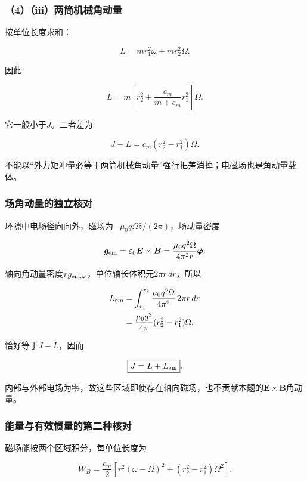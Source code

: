 \documentclass[12pt,a4paper,fontset=fandol]{ctexart}
\begin{document}
\subsubsection{（4）（iii）两筒机械角动量}\label{iiiux4e24ux7b52ux673aux68b0ux89d2ux52a8ux91cf}

按单位长度求和：

\[
L=m r_1^2\omega+m r_2^2\Omega.
\]

因此

\[
\boxed{
L=m\left[r_2^2+\frac{c_m}{m+c_m}r_1^2\right]\Omega}.
\]

它一般小于\(J\)。二者差为

\[
\boxed{J-L=c_m(r_2^2-r_1^2)\Omega}.
\]

不能以``外力矩冲量必等于两筒机械角动量''强行把差消掉；电磁场也是角动量载体。

\subsubsection{场角动量的独立核对}\label{ux573aux89d2ux52a8ux91cfux7684ux72ecux7acbux6838ux5bf9}

环隙中电场径向向外，磁场为\(-\mu_0q\Omega\hat z/(2\pi)\)，场动量密度

\[
\boldsymbol g_{\rm em}=\varepsilon_0\boldsymbol E\times\boldsymbol B
=\frac{\mu_0q^2\Omega}{4\pi^2r}\hat{\boldsymbol\varphi}.
\]

轴向角动量密度\(r g_{{\rm em},\varphi}\)，单位轴长体积元\(2\pi r\,dr\)，所以

\[
\begin{aligned}
L_{\rm em}
&=\int_{r_1}^{r_2}
\frac{\mu_0q^2\Omega}{4\pi^2}\,2\pi r\,dr\\
&=\frac{\mu_0q^2}{4\pi}(r_2^2-r_1^2)\Omega.
\end{aligned}
\]

恰好等于\(J-L\)，因而

\[
\boxed{J=L+L_{\rm em}}.
\]

内部与外部电场为零，故这些区域即使存在轴向磁场，也不贡献本题的\(\boldsymbol E\times\boldsymbol B\)角动量。

\subsubsection{能量与有效惯量的第二种核对}\label{ux80fdux91cfux4e0eux6709ux6548ux60efux91cfux7684ux7b2cux4e8cux79cdux6838ux5bf9}

磁场能按两个区域积分，每单位长度为

\[
W_B=\frac{c_m}{2}
\left[r_1^2(\omega-\Omega)^2
+(r_2^2-r_1^2)\Omega^2\right].
\]
\end{document}
